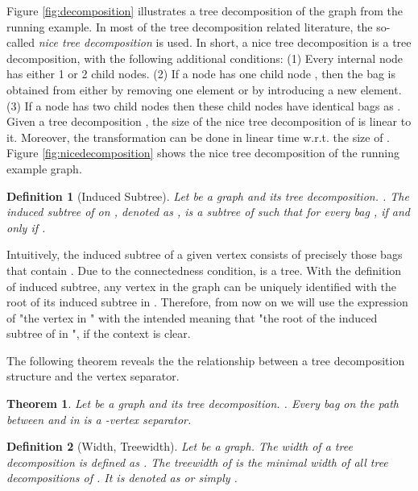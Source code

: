 \documentclass[preprint,12pt]{elsarticle}
\newtheorem{theorem}{Theorem}
\newtheorem{definition}{Definition}
\begin{document}
Figure \ref{fig:decomposition} illustrates a tree decomposition of the graph from the running example.
In most of the tree decomposition related literature, the so-called \emph{nice tree decomposition}
 is used. In short, a nice tree decomposition is a tree decomposition, with 
 the following additional conditions:
(1) Every internal node  has either 1 or 2 child nodes.
(2) If a node  has one child node , then the bag  is obtained from  either
by removing one element or by introducing a new element. (3) If a node  has two
child nodes then these child nodes have identical bags as .
Given a tree decomposition ,  the size of the  nice tree decomposition of 
 is linear to it. Moreover, the transformation can be done in linear time
w.r.t. the size of . 
Figure \ref{fig:nicedecomposition} shows the nice tree decomposition of the running example graph. 








\begin{definition} [Induced Subtree]
Let  be a graph and  its tree decomposition. . 
The induced subtree of  on ,
denoted as , is a subtree of  such that
for every bag ,  
 if and only if .
\end{definition}

Intuitively, the induced subtree of a given vertex  consists of precisely those bags that contain .
Due to the connectedness condition,  is a tree.
With the definition of induced subtree, any vertex  in the graph  can be uniquely
identified with the root of its induced subtree in .
Therefore, from now on we will use the expression of "the vertex  in " with the intended meaning
that "the root of the induced subtree of  in ", if the context is clear.


The following theorem reveals the the relationship between a tree decomposition structure 
and the vertex separator.

\begin{theorem} \cite{TEDI}
Let  be a graph and  its tree decomposition. 
.
Every bag  on the path between  and  in   
is a -vertex separator.
\label{the:vsintd}
\end{theorem}








\begin{definition} [Width, Treewidth] 
Let  be a graph.
The \emph{width} of a tree decomposition  is defined as .
The \emph{treewidth} of  is the minimal width of all tree decompositions of . It is denoted as  or simply .
\label{def:treewidth}
\end{definition}
\end{document}
